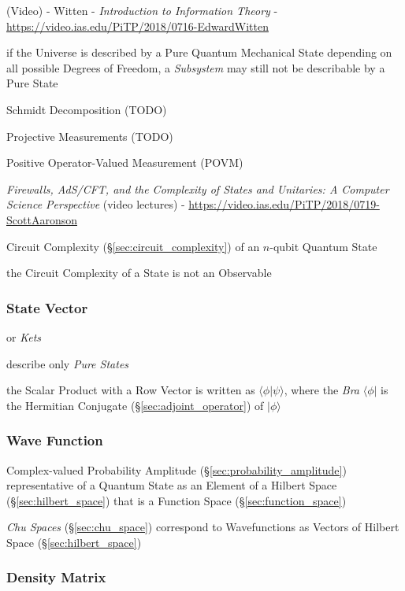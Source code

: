 \asterism

(Video) - Witten - \emph{Introduction to Information Theory} -
\url{https://video.ias.edu/PiTP/2018/0716-EdwardWitten}

if the Universe is described by a Pure Quantum Mechanical State depending on all
possible Degrees of Freedom, a \emph{Subsystem} may still not be describable by
a Pure State

Schmidt Decomposition (TODO)

Projective Measurements (TODO)

Positive Operator-Valued Measurement (POVM)

\emph{Firewalls, AdS/CFT, and the Complexity of States and Unitaries: A Computer
  Science Perspective}
(video lectures)
-
\url{https://video.ias.edu/PiTP/2018/0719-ScottAaronson}

Circuit Complexity (\S\ref{sec:circuit_complexity}) of an $n$-qubit Quantum
State

the Circuit Complexity of a State is not an Observable



\subsubsection{State Vector}\label{sec:state_vector}

or \emph{Kets}

describe only \emph{Pure States}

the Scalar Product with a Row Vector is written as $\langle\phi|\psi\rangle$,
where the \emph{Bra} $\langle\phi|$ is the Hermitian Conjugate
(\S\ref{sec:adjoint_operator}) of $|\phi\rangle$



\subsubsection{Wave Function}\label{sec:wave_function}

Complex-valued Probability Amplitude (\S\ref{sec:probability_amplitude})
representative of a Quantum State as an Element of a Hilbert Space
(\S\ref{sec:hilbert_space}) that is a Function Space
(\S\ref{sec:function_space})

\fist \emph{Chu Spaces} (\S\ref{sec:chu_space}) correspond to Wavefunctions as
Vectors of Hilbert Space (\S\ref{sec:hilbert_space})



\subsubsection{Density Matrix}\label{sec:density_matrix}

